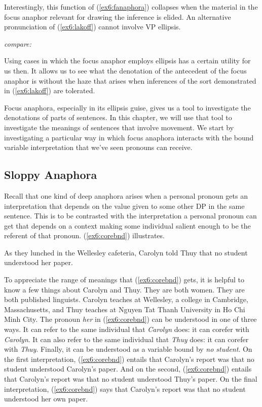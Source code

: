 Interestingly, this function of (\ref{ex6:fanaphora}) collapses when the material in the focus anaphor relevant for drawing the inference is elided. An alternative pronunciation of (\ref{ex6:lakoff}) cannot involve VP ellipsis.
\begin{exe}
	\raggedright
	\sn \emph{compare:}
\end{exe}
Using cases in which the focus anaphor employs ellipsis has a certain utility for us then. It allows us to see what the denotation of the antecedent of the focus anaphor is without the haze that arises when inferences of the sort demonstrated in (\ref{ex6:lakoff}) are tolerated.

Focus anaphora, especially in its ellipsis guise, gives us a tool to investigate the denotations of parts of sentences. In this chapter, we will use that tool to investigate the meanings of sentences that involve movement. We start by investigating a particular way in which focus anaphora interacts with the bound variable interpretation that we've seen pronouns can receive.

\subsection{Sloppy Anaphora}
\label{sec:slopana}

Recall that one kind of deep anaphora arises when a personal pronoun gets an interpretation that depends on the value given to some other DP in the same sentence. This is to be contrasted with the interpretation a personal pronoun can get that depends on a context making some individual salient enough to be the referent of that pronoun. (\ref{ex6:corebnd}) illustrates.
\begin{exe}
	\raggedright
	\ex \label{ex6:corebnd}
	As they lunched in the Wellesley cafeteria, Carolyn told Thuy that no student understood her paper.
\end{exe}
To appreciate the range of meanings that (\ref{ex6:corebnd}) gets, it is helpful to know a few things about Carolyn and Thuy. They are both women. They are both published linguists. Carolyn teaches at Wellesley, a college in Cambridge, Massachusetts, and Thuy teaches at Nguyen Tat Thanh University in Ho Chi Minh City. The pronoun \emph{her} in (\ref{ex6:corebnd}) can be understood in one of three ways. It can refer to the same individual that \emph{Carolyn} does: it can corefer with \emph{Carolyn}. It can also refer to the same individual that \emph{Thuy} does: it can corefer with \emph{Thuy}. Finally, it can be understood as a variable bound by \emph{no student}. On the first interpretation, (\ref{ex6:corebnd}) entails that Carolyn's report was that no student understood Carolyn's paper. And on the second, (\ref{ex6:corebnd}) entails that Carolyn's report was that no student understood Thuy's paper. On the final interpretation, (\ref{ex6:corebnd}) says that Carolyn's report was that no student understood her own paper.

